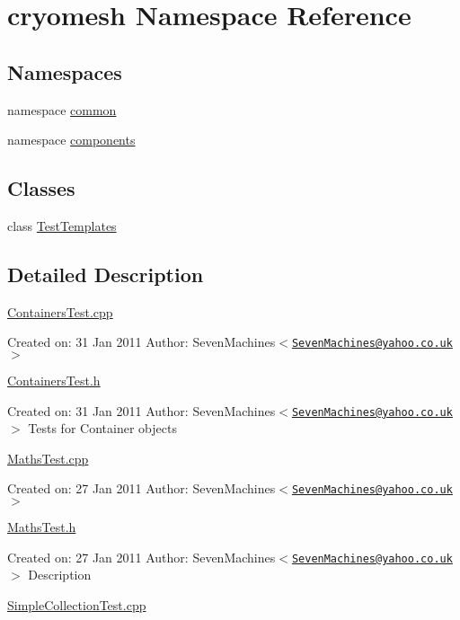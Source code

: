 \hypertarget{namespacecryomesh}{
\section{cryomesh Namespace Reference}
\label{namespacecryomesh}
}
\subsection*{Namespaces}
\begin{DoxyCompactItemize}
\item 
namespace \hyperlink{namespacecryomesh_1_1common}{common}
\item 
namespace \hyperlink{namespacecryomesh_1_1components}{components}
\end{DoxyCompactItemize}
\subsection*{Classes}
\begin{DoxyCompactItemize}
\item 
class \hyperlink{classcryomesh_1_1_test_templates}{TestTemplates}
\end{DoxyCompactItemize}


\subsection{Detailed Description}
\hyperlink{_containers_test_8cpp}{ContainersTest.cpp}

Created on: 31 Jan 2011 Author: SevenMachines$<$\href{mailto:SevenMachines@yahoo.co.uk}{\tt SevenMachines@yahoo.co.uk}$>$

\hyperlink{_containers_test_8h}{ContainersTest.h}

Created on: 31 Jan 2011 Author: SevenMachines$<$\href{mailto:SevenMachines@yahoo.co.uk}{\tt SevenMachines@yahoo.co.uk}$>$ Tests for Container objects

\hyperlink{_maths_test_8cpp}{MathsTest.cpp}

Created on: 27 Jan 2011 Author: SevenMachines$<$\href{mailto:SevenMachines@yahoo.co.uk}{\tt SevenMachines@yahoo.co.uk}$>$

\hyperlink{_maths_test_8h}{MathsTest.h}

Created on: 27 Jan 2011 Author: SevenMachines$<$\href{mailto:SevenMachines@yahoo.co.uk}{\tt SevenMachines@yahoo.co.uk}$>$ Description

\hyperlink{_simple_collection_test_8cpp}{SimpleCollectionTest.cpp}

